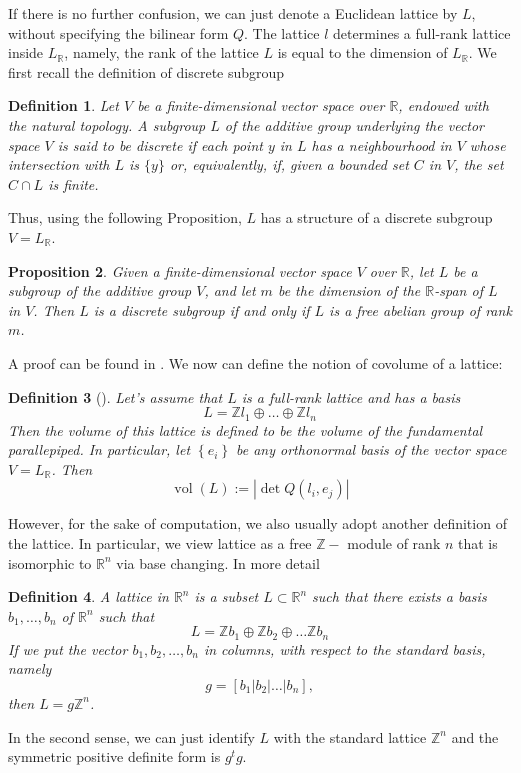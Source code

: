 \documentclass[12pt]{article} %
\newtheorem{definition}{Definition}[section]
\newtheorem{prop}[definition]{Proposition}
\DeclareMathOperator{\vol}{vol}
\begin{document}
If there is no further confusion, we can just denote a Euclidean lattice by $L$, without specifying the bilinear form
$Q$. The lattice $l$ determines a full-rank lattice inside $L_\mathbb{R}$, namely, the rank
of the lattice $L$ is equal to the dimension of $L_\mathbb{R}$. We first recall the definition of discrete subgroup
\begin{definition}
    Let $V$ be a finite-dimensional vector space over $\mathbb{R}$, endowed with the natural topology. A subgroup $L$ of the additive group underlying the vector space $V$ is said to be \textit{discrete} if each point $y$ in $L$ has a neighbourhood in $V$ whose intersection with $L$ is $\{y\}$ or, equivalently, if, given a bounded set $C$ in $V$, the set $C \cap L$ is finite.
\end{definition}
Thus, using the following Proposition, $L$ has a structure of a discrete subgroup $V = L_\mathbb{R}$.
\begin{prop}
    Given a finite-dimensional vector space $V$ over $\mathbb{R}$, let $L$ be a subgroup of the additive group $V$, and let $m$ be the dimension of the $\mathbb{R}$-span of $L$ in $V$. Then $L$ is a discrete subgroup if and only if $L$ is a free abelian group of rank $m$.
\end{prop}
A proof can be found in \cite{}.
We now can define the notion of covolume of a lattice:
\begin{definition}[\label = Volume]
    Let's assume that $L$ is a full-rank lattice and has a basis
    \[L = \mathbb{Z}l_1 \oplus \ldots \oplus\mathbb{Z}l_n\]
    Then the volume of this lattice is defined to be the volume of the fundamental
    parallepiped. In particular, let $\left\lbrace e_i\right\rbrace$ be any orthonormal
    basis of the vector space $V = L_\mathbb{R}$. Then
    \[\vol(L) := \left|\det Q(l_i,e_j)\right|\]
\end{definition}
However, for the sake of computation, we also usually adopt another definition of the lattice.
In particular, we view lattice as a free $\mathbb{Z}-$ module of rank $n$ that is isomorphic
to $\mathbb{R}^n$ via base changing.
In more detail
\begin{definition}
    A \textit{lattice} in $\mathbb{R}^n$ is a subset $L \subset \mathbb{R}^n$ such that there exists
    a basis $b_1,\ldots,b_n$ of $\mathbb{R}^n$ such that
    \[L = \mathbb{Z}b_1\oplus \mathbb{Z}b_2\oplus \ldots \mathbb{Z}b_n\]
    If we put the vector $b_1,b_2,\ldots,b_n$ in columns, with respect to the standard basis, namely
    \[g = [b_1 | b_2 | \ldots | b_n] ,\]
    then $L = g\mathbb{Z}^n$.
\end{definition}
In the second sense, we can just identify $L$ with the standard lattice $\mathbb{Z}^n$ and the
symmetric positive definite form is $g^tg$.
\end{document}

